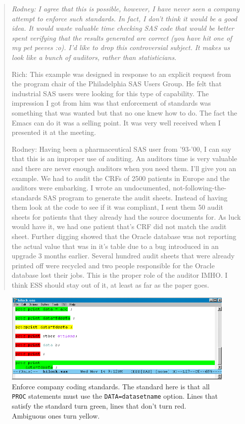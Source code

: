 \documentclass{article}
\newif\ifdraft
\newcommand{\stexttt}[1]{{\small\texttt{#1}}}
\newcommand{\emptyfig}{
\hspace*{42pt}\rule{324pt}{.25pt}\\
\hspace*{42pt}\rule{.25pt}{10pc}
\rule{316pt}{.25pt}
\rule{.25pt}{10pc}}
\newenvironment{Comment}{\begin{quote}\small\itshape }{\end{quote}}
\begin{document}
\begin{Comment} Rodney: I agree that this is possible, however, I 
 have never seen a company attempt to enforce such standards.  In fact,
 I don't think it would be a good idea.  It would waste valuable time 
 checking SAS code that would be better spent verifying that the results 
 generated are correct (you have hit one of my pet peeves :o).
 I'd like to drop this controversial subject.  It makes us look like
 a bunch of auditors, rather than statisticians.

Rich: This example was designed in response to an explicit request
from the program chair of the Philadelphia SAS Users Group.  He felt
that industrial SAS users were looking for this type of capability.
The impression I got from him was that enforcement of standards was
something that was wanted but that no one knew how to do.  The fact
the Emacs can do it was a selling point.  It was very well received
when I presented it at the meeting.

Rodney: Having been a pharmaceutical SAS user from '93-'00, I can say
that this is an improper use of auditing.  An auditors time is very 
valuable and there are never enough auditors when you need them.  
I'll give you an example.  We had to audit the CRFs of 2500 patients 
in Europe and the auditors were embarking.  I wrote an undocumented, 
not-following-the-standards SAS program to generate the audit sheets.  
Instead of having them look at the code to see if it was compliant, 
I sent them 50 audit sheets for patients that they already had the 
source documents for.  As luck would have it, we had one patient that's 
CRF did not match the audit sheet.  Further digging showed that the 
Oracle database was not reporting the actual value that was in
it's table due to a bug introduced in an upgrade 3 months earlier.
Several hundred audit sheets that were already printed off were
recycled and two people responsible for the Oracle database lost 
their jobs.  This is the proper role of the auditor IMHO.  I think
ESS should stay out of it, at least as far as the paper goes.
\end{Comment}

\begin{figure}[tbp]
  \centering
  \ifdraft
     \emptyfig
  \else
     \includegraphics[angle=270,width=\textwidth]{hilock-sas}
  \fi
  \caption{Enforce company coding standards.  The standard here is
    that all \stexttt{PROC} statements must use the
    \stexttt{DATA=datasetname} option.  Lines that satisfy the
    standard turn green, lines that don't turn red.
    Ambiguous ones turn yellow.}
  \label{f.hilock}
\end{figure}
\end{document}
